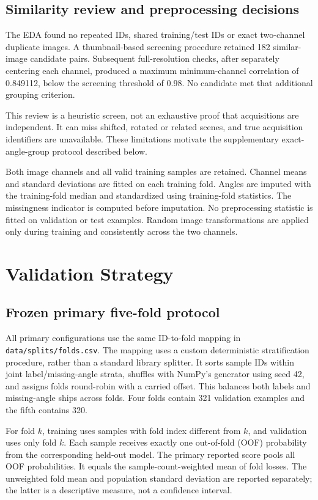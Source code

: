 \documentclass[journal]{IEEEtran}
\begin{document}
\subsection{Similarity review and preprocessing decisions}
The EDA found no repeated IDs, shared training/test IDs or exact two-channel duplicate images. A thumbnail-based screening procedure retained 182 similar-image candidate pairs. Subsequent full-resolution checks, after separately centering each channel, produced a maximum minimum-channel correlation of 0.849112, below the screening threshold of 0.98. No candidate met that additional grouping criterion.

This review is a heuristic screen, not an exhaustive proof that acquisitions are independent. It can miss shifted, rotated or related scenes, and true acquisition identifiers are unavailable. These limitations motivate the supplementary exact-angle-group protocol described below.

Both image channels and all valid training samples are retained. Channel means and standard deviations are fitted on each training fold. Angles are imputed with the training-fold median and standardized using training-fold statistics. The missingness indicator is computed before imputation. No preprocessing statistic is fitted on validation or test examples. Random image transformations are applied only during training and consistently across the two channels.

\section{Validation Strategy}
\subsection{Frozen primary five-fold protocol}
All primary configurations use the same ID-to-fold mapping in \texttt{data/splits/folds.csv}. The mapping uses a custom deterministic stratification procedure, rather than a standard library splitter. It sorts sample IDs within joint label/missing-angle strata, shuffles with NumPy's generator using seed 42, and assigns folds round-robin with a carried offset. This balances both labels and missing-angle ships across folds. Four folds contain 321 validation examples and the fifth contains 320.

For fold $k$, training uses samples with fold index different from $k$, and validation uses only fold $k$. Each sample receives exactly one out-of-fold (OOF) probability from the corresponding held-out model. The primary reported score pools all OOF probabilities. It equals the sample-count-weighted mean of fold losses. The unweighted fold mean and population standard deviation are reported separately; the latter is a descriptive measure, not a confidence interval.
\end{document}
